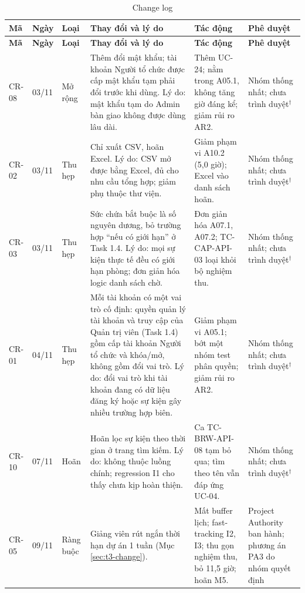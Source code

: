 \begingroup\footnotesize
\renewcommand{\arraystretch}{1.15}
\begin{longtable}{@{}p{.06\linewidth}p{.07\linewidth}p{.10\linewidth}p{.27\linewidth}p{.29\linewidth}p{.13\linewidth}@{}}
\caption{Change log}\label{tab:t3-cr-log}\\
\toprule
\textbf{Mã} & \textbf{Ngày} & \textbf{Loại} & \textbf{Thay đổi và lý do} & \textbf{Tác động} & \textbf{Phê duyệt}\\\midrule\endfirsthead
\toprule
\textbf{Mã} & \textbf{Ngày} & \textbf{Loại} & \textbf{Thay đổi và lý do} & \textbf{Tác động} & \textbf{Phê duyệt}\\\midrule\endhead
\bottomrule\endfoot
CR-08 & 03/11 & Mở rộng & Thêm đổi mật khẩu; tài khoản Người tổ chức được cấp mật khẩu tạm phải đổi trước khi dùng. Lý do: mật khẩu tạm do Admin bàn giao không được dùng lâu dài. & Thêm UC-24; nằm trong A05.1, không tăng giờ đáng kể; giảm rủi ro AR2. & Nhóm thống nhất; chưa trình duyệt$^{\dagger}$\\
CR-02 & 03/11 & Thu hẹp & Chỉ xuất CSV, hoãn Excel. Lý do: CSV mở được bằng Excel, đủ cho nhu cầu tổng hợp; giảm phụ thuộc thư viện. & Giảm phạm vi A10.2 (5,0 giờ); Excel vào danh sách hoãn. & Nhóm thống nhất; chưa trình duyệt$^{\dagger}$\\
CR-03 & 03/11 & Thu hẹp & Sức chứa bắt buộc là số nguyên dương, bỏ trường hợp ``nếu có giới hạn'' ở Task 1.4. Lý do: mọi sự kiện thực tế đều có giới hạn phòng; đơn giản hóa logic danh sách chờ. & Đơn giản hóa A07.1, A07.2; TC-CAP-API-03 loại khỏi bộ nghiệm thu. & Nhóm thống nhất; chưa trình duyệt$^{\dagger}$\\
CR-01 & 04/11 & Thu hẹp & Mỗi tài khoản có một vai trò cố định: quyền quản lý tài khoản và truy cập của Quản trị viên (Task 1.4) gồm cấp tài khoản Người tổ chức và khóa/mở, không gồm đổi vai trò. Lý do: đổi vai trò khi tài khoản đang có dữ liệu đăng ký hoặc sự kiện gây nhiều trường hợp biên. & Giảm phạm vi A05.1; bớt một nhóm test phân quyền; giảm rủi ro AR2. & Nhóm thống nhất; chưa trình duyệt$^{\dagger}$\\
CR-10 & 07/11 & Hoãn & Hoãn lọc sự kiện theo thời gian ở trang tìm kiếm. Lý do: không thuộc luồng chính; regression I1 cho thấy chưa kịp hoàn thiện. & Ca TC-BRW-API-08 tạm bỏ qua; tìm theo tên vẫn đáp ứng UC-04. & Nhóm thống nhất; chưa trình duyệt$^{\dagger}$\\
CR-05 & 09/11 & Ràng buộc & Giảng viên rút ngắn thời hạn dự án 1 tuần (Mục \ref{sec:t3-change}). & Mất buffer lịch; fast-tracking I2, I3; thu gọn nghiệm thu, bỏ 11,5 giờ; hoãn M5. & Project Authority ban hành; phương án PA3 do nhóm quyết định\\

\end{longtable}
